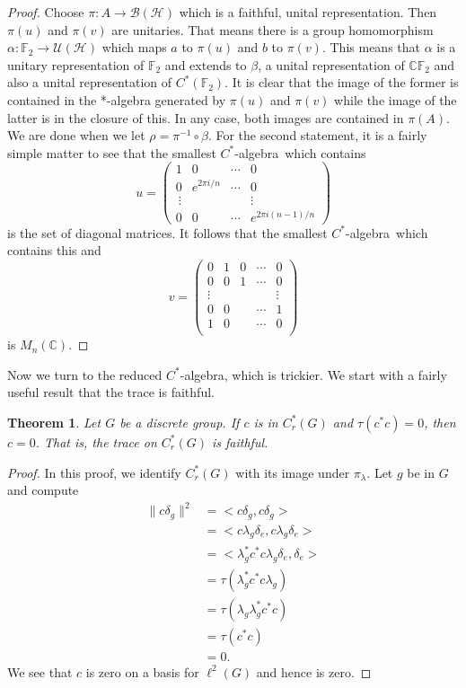 \documentclass{book}
\newtheorem{theorem}[definition]{Theorem}
\def\cstar{\(C^*\)-algebra}
\begin{document}
\begin{proof}
  Choose \(\pi:A\rightarrow \mathcal{B}(\mathcal{H})\) which is
  a faithful, unital representation. Then \(\pi(u)\) and \(\pi(v)\) are unitaries. That
  means there is a group homomorphism \(\alpha : \mathbb{F}_2\rightarrow \mathcal{U}(\mathcal{H})\) which maps \(a\) to
  \(\pi(u)\) and \(b\) to \(\pi(v)\). This means that \(\alpha\) is a unitary representation of \(\mathbb{F}_2\) and
  extends to \(\beta\), a unital representation of \(\mathbb{C}\mathbb{F}_2\) and also a unital representation
  of \(C^*(\mathbb{F}_2)\). It is clear that the image of the former is contained in the 
  *-algebra generated by \(\pi(u)\) and \(\pi(v)\) while the image of the latter is in the
  closure of this. In any case, both images are contained in \(\pi(A)\). We are done
  when we let \(\rho=\pi^{-1}\circ \beta\).
  For the second statement, it is a fairly simple matter to see that the
  smallest \cstar\ which contains
  \[
    u=
    \begin{pmatrix}
    1 &0 &\cdots &0\\
    0 &e^{2\pi i/n} & \cdots &0\\\
    \vdots &&  &\vdots\\
    0& 0& \cdots & e^{2\pi i(n-1)/n}
    \end{pmatrix}
  \]
  is the set of diagonal matrices. It follows that the smallest \cstar\ which
  contains this and
  \[
    v=
    \begin{pmatrix}
    0 &1 &0 &\cdots &0\\
    0 &0 &1 &\cdots &0\\
    \vdots & & & &\vdots\\
    0 &0 &&\cdots &1\\
    1 &0 &&\cdots &0\\
    \end{pmatrix}
  \]
  is \(M_n(\mathbb{C})\).\par
\end{proof}
  Now we turn to the reduced \cstar, which is trickier. We start with
  a fairly useful result that the trace is faithful.
\begin{theorem}\label{theorem:274}
  Let \(G\) be a discrete group. If \(c\) is in \(C^*_r(G)\) and \(\tau(c^*c)=0\),
  then \(c=0\). That is, the trace on \(C^*_r(G)\) is faithful.
\end{theorem}
\begin{proof}
  In this proof, we identify \(C^*_r(G)\) with its image under \(\pi_\lambda\). Let \(g\) be in
  \(G\) and compute
  \begin{align*}
    \|c\delta_g\|^2 &= < c\delta_g,c\delta_g >\\
    &= <c\lambda_g\delta_e,c\lambda_g\delta_e >\\
    &= <\lambda^*_gc^*c\lambda_g\delta_e,\delta_e >\\
    &= \tau(\lambda^*_g c^*c\lambda_g)\\
    &= \tau(\lambda_g\lambda^*_g c^*c)\\
    &= \tau(c^*c)\\
    &= 0.
  \end{align*}
  We see that \(c\) is zero on a basis for \(\ell^2(G)\) and hence is zero.
\end{proof}
\end{document}
